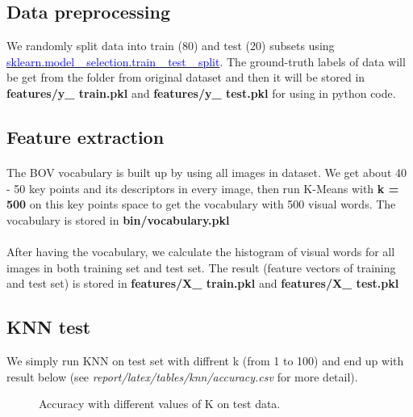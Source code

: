 \subsection{Data preprocessing}
We randomly split data into train (80) and test (20) subsets using \href{http://scikit-learn.org/stable/modules/classes.html}{\textcolor{blue}{sklearn.model\_ selection.train\_ test\_ split}}. The ground-truth labels of data will be get from the folder from original dataset and then it will be stored in \textbf{features/y\_ train.pkl} and \textbf{features/y\_ test.pkl} for using in python code.

\subsection{Feature extraction}
\paragraph*{}
The BOV vocabulary is built up by using all images in dataset. We get about 40 - 50 key points and its descriptors in every image, then run K-Means with \textbf{k = 500} on this key points space to get the vocabulary with 500 visual words. The vocabulary is stored in \textbf{bin/vocabulary.pkl }

\paragraph*{}
After having the vocabulary, we calculate the histogram of visual words for all images in both training set and test set. The result (feature vectors of training and test set) is stored in \textbf{features/X\_ train.pkl} and \textbf{features/X\_ test.pkl}

\subsection{KNN test}
We simply run KNN on test set with diffrent k (from 1 to 100) and end up with result below (see \textit{report/latex/tables/knn/accuracy.csv} for more detail).
\pagebreak
\begin{figure}[h!]
  \begin{center}
    \caption[KNN result with different values of K]{Accuracy with different values of K on test data.}
  \end{center}
\end{figure}

